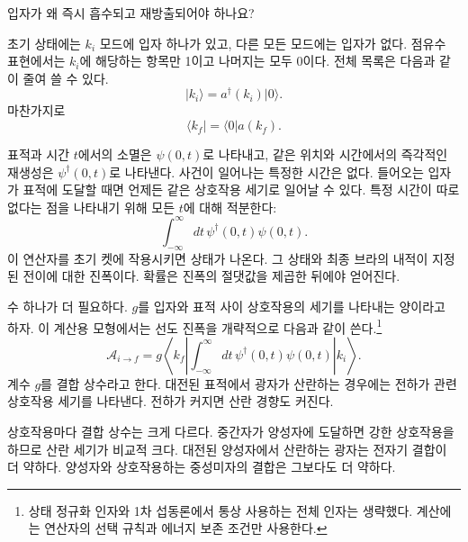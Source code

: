 \begin{classroomqa}
입자가 왜 즉시 흡수되고 재방출되어야 하나요?\audiencequestion{}
\end{classroomqa}

초기 상태에는 \(k_i\) 모드에 입자 하나가 있고, 다른 모든 모드에는 입자가 없다. 점유수 표현에서는 \(k_i\)에 해당하는 항목만 1이고 나머지는 모두 0이다. 전체 목록은 다음과 같이 줄여 쓸 수 있다.
\begin{equation}
\lvert k_i\rangle=a^\dagger(k_i)\lvert0\rangle.
\end{equation}
마찬가지로
\begin{equation}
\langle k_f\rvert=\langle0\rvert a(k_f).
\end{equation}

표적과 시간 \(t\)에서의 소멸은 \(\psi(0,t)\)로 나타내고, 같은 위치와 시간에서의 즉각적인 재생성은 \(\psi^\dagger(0,t)\)로 나타낸다. 사건이 일어나는 특정한 시간은 없다. 들어오는 입자가 표적에 도달할 때면 언제든 같은 상호작용 세기로 일어날 수 있다. 특정 시간이 따로 없다는 점을 나타내기 위해 모든 \(t\)에 대해 적분한다:
\begin{equation}
\int_{-\infty}^{\infty}dt\,\psi^\dagger(0,t)\psi(0,t).
\end{equation}
이 연산자를 초기 켓에 작용시키면 상태가 나온다. 그 상태와 최종 브라의 내적이 지정된 전이에 대한 진폭이다. 확률은 진폭의 절댓값을 제곱한 뒤에야 얻어진다.

수 하나가 더 필요하다. \(g\)를 입자와 표적 사이 상호작용의 세기를 나타내는 양이라고 하자. 이 계산용 모형에서는 선도 진폭을 개략적으로 다음과 같이 쓴다.\footnote{상태 정규화 인자와 1차 섭동론에서 통상 사용하는 전체 인자는 생략했다. 계산에는 연산자의 선택 규칙과 에너지 보존 조건만 사용한다.}
\begin{equation}
\mathcal A_{i\to f}
=g\left\langle k_f\left|
\int_{-\infty}^{\infty}dt\,
\psi^\dagger(0,t)\psi(0,t)
\right|k_i\right\rangle.
\end{equation}
계수 \(g\)를 결합 상수라고 한다. 대전된 표적에서 광자가 산란하는 경우에는 전하가 관련 상호작용 세기를 나타낸다. 전하가 커지면 산란 경향도 커진다.

상호작용마다 결합 상수는 크게 다르다. 중간자가 양성자에 도달하면 강한 상호작용을 하므로 산란 세기가 비교적 크다. 대전된 양성자에서 산란하는 광자는 전자기 결합이 더 약하다. 양성자와 상호작용하는 중성미자의 결합은 그보다도 더 약하다.

